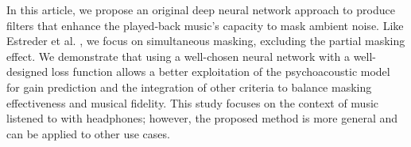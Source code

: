 In this article, we propose an original deep neural network approach to produce filters that enhance the played-back music's capacity to mask ambient noise. Like Estreder et al. \cite{estrederPerceptualAudioEqualization2018}, we focus on simultaneous masking, excluding the partial masking effect.  We demonstrate that using a well-chosen neural network with a well-designed loss function allows a better exploitation of the psychoacoustic model for gain prediction and the integration of other criteria to balance masking effectiveness and musical fidelity.  This study focuses on the context of music listened to with headphones; however, the proposed method is more general and can be applied to other use cases.



